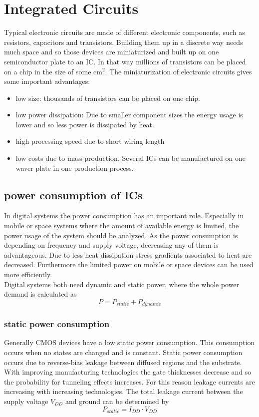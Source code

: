 \chapter{Integrated Circuits}
\label{kap:hardware}
Typical electronic circuits are made of different electronic components, such as resistors, capacitors and transistors. Building them up in a discrete way needs much space and so those devices are miniaturized and built up on one semiconductor plate to an IC. In that way millions of transistors can be placed on a chip in the size of some cm$^2$. The miniaturization of electronic circuits gives some important advantages:
\begin{itemize}
\item low size: thousands of transistors can be placed on one chip.
\item low power dissipation: Due to smaller component sizes the energy usage is lower and so less power is dissipated by heat.
\item high processing speed due to short wiring length
\item low costs due to mass production. Several ICs can be manufactured on one waver plate in one production process.
\end{itemize}
\section{power consumption of ICs}
In digital systems the power consumption has an important role. Especially in mobile or space systems where the amount of available energy is limited, the power usage of the system should be analyzed. As the power consumption is depending on frequency and supply voltage, decreasing any of them is advantageous. Due to less heat dissipation stress gradients associated to heat are decreased. Furthermore the limited power on mobile or space devices can be used more efficiently.\\
Digital systems both need dynamic and static power, where the whole power demand is calculated as
\begin{equation}
P=P_{static}+P_{dynamic}
\end{equation}
\subsection{static power consumption}
Generally CMOS devices have a low static power consumption. This consumption occurs when no states are changed and is constant. Static power consumption occurs due to reverse-bias leakage between diffused regions and the substrate.\cite{Sar97} With improving manufacturing technologies the gate thicknesses decrease and so the probability for tunneling effects increases. For this reason leakage currents are increasing with increasing technologies.\cite{Iye10} The total leakage current between the supply voltage $V_{DD}$ and ground can be determined by
\begin{equation}
P_{static}=I_{DD}\cdot V_{DD}
\end{equation}
